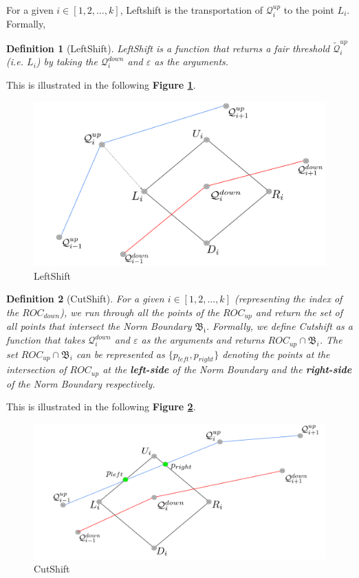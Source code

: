 \documentclass{article}
\newtheorem{definition}{Definition}[section]
\begin{document}
For a given $ i \in [1 , 2, \hdots ,k]$, Leftshift is the transportation of $\mathcal{Q}_i^{up}$ to the point $L_i$. Formally,
\begin{definition}[LeftShift] \label{def:csh}
LeftShift is a function that returns a fair threshold $\widetilde{\mathcal{Q}}_i^{up}$ (i.e. $L_i$) by taking the $\mathcal{Q}_i^{down}$ and $\varepsilon$ as the arguments.
\end{definition}
This is illustrated in the following \textbf{Figure \ref{fig:LS}}.
\begin{figure}[!h]
    \centering
    \includegraphics[scale = 0.35]{diagrams/LeftShift_updated.png}
    \caption{LeftShift}
    \label{fig:LS}
\end{figure}
\begin{definition}[CutShift] \label{def:ush}
    For a given $i \in [1 , 2, \hdots ,k]$ (representing the index of the $ROC_{down}$), we run through all the points of the $ROC_{up}$ and return the set of all points that intersect the Norm Boundary $\mathfrak{B_i}$. Formally, we define \emph{Cutshift} as a function that takes $\mathcal{Q}_i^{down}$ and $\varepsilon$ as the arguments and returns $ROC_{up} \cap \mathfrak{B}_i$. The set $ROC_{up} \cap \mathfrak{B}_i$ can be represented as $\{p_{left} , p_{right}\}$ denoting the points at the intersection of $ROC_{up}$ at the \textbf{left-side} of the Norm Boundary and the \textbf{right-side} of the Norm Boundary respectively.
\end{definition}

This is illustrated in the following \textbf{Figure \ref{fig:CS}}.
\begin{figure}[!h]
    \centering
    \includegraphics[scale = 0.35]{diagrams/CutShift_updated.png}
    \caption{CutShift}
    \label{fig:CS}
\end{figure}
\end{document}
